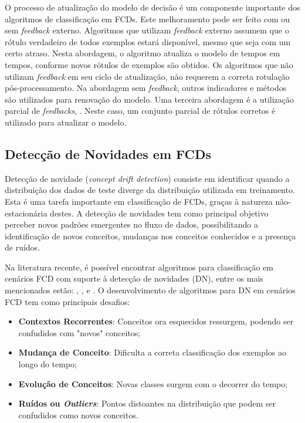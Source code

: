 \documentclass[qual, classic, a4paper]{ufbathesis}
\begin{document}
O processo de atualização do modelo de decisão é um componente importante dos algoritmos de classificação em FCDs. Este melhoramento pode ser feito com ou sem \textit{feedback} externo. Algoritmos que utilizam \textit{feedback} externo assumem que o rótulo verdadeiro de todos exemplos estará disponível, mesmo que seja com um certo atraso. 
Nesta abordagem, o algoritmo atualiza o modelo de tempos em tempos, conforme novos rótulos de exemplos são obtidos. Os algoritmos que não utilizam \textit{feedback} em seu ciclo de atualização, não requerem a correta rotulação pós-processamento. Na abordagem sem \textit{feedback}, outros indicadores e métodos são utilizados para renovação do modelo. Uma terceira abordagem é a utilização parcial de \textit{feedbacks},
. Neste caso, um conjunto parcial de rótulos corretos é utilizado para atualizar o modelo.

\subsection{Detecção de Novidades em FCDs}

Detecção de novidade (\textit{concept drift detection}) consiste em identificar quando a distribuição dos dados de teste diverge da distribuição utilizada em treinamento. Esta é uma tarefa importante em classificação de FCDs, graças à natureza não-estacionária destes. A detecção de novidades tem como principal objetivo perceber novos padrões emergentes no fluxo de dados, possibilitando a identificação de novos conceitos, mudanças nos conceitos conhecidos e a presença de ruídos.

Na literatura recente, é possível encontrar algoritmos para classificação em cenários FCD com suporte à detecção de novidades (DN), entre os mais mencionados estão: \cite{Masud:2010:ACC:1933307.1934606}, \cite{Spinosa:2009:NDA:1551768.1551770}, \cite{Hayat:5686734} e \cite{Farid:6471629}. O desenvolvimento de algoritmos para DN em cenários FCD tem como principais desafios:

\begin{itemize}
    \item \textbf{Contextos Recorrentes}: Conceitos ora esquecidos ressurgem, podendo ser confudidos com "novos" conceitos;
    
    \item \textbf{Mudança de Conceito}: Dificulta a correta classificação dos exemplos ao longo do tempo;

    \item \textbf{Evolução de Conceitos}: Novas classes surgem com o decorrer do tempo;

    \item \textbf{Ruídos ou \textit{Outliers}}: Pontos distoantes na distribuição que podem ser confudidos como novos conceitos.
\end{itemize}
\end{document}
